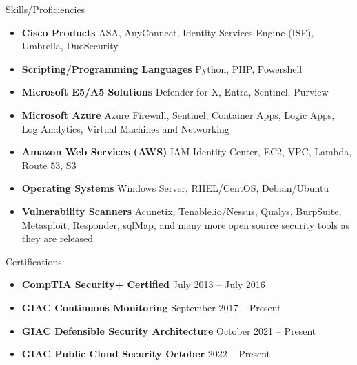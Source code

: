 \documentclass[]{mcdowellcv}
\begin{document}
\begin{cvsection}{Skills/Proficiencies}
    \begin{cvsubsection}{}{}{}
        \begin{itemize}
            \item \textbf{Cisco Products}  ASA, AnyConnect, Identity Services Engine (ISE), Umbrella, DuoSecurity
            \item \textbf{Scripting/Programming Languages}  Python, PHP, Powershell
            \item \textbf{Microsoft E5/A5 Solutions}  Defender for X, Entra, Sentinel, Purview
            \item \textbf{Microsoft Azure} Azure Firewall, Sentinel, Container Apps, Logic Apps, Log Analytics, Virtual Machines and Networking
            \item \textbf{Amazon Web Services (AWS)} IAM Identity Center, EC2, VPC, Lambda, Route 53, S3 
            \item \textbf{Operating Systems} Windows Server, RHEL/CentOS, Debian/Ubuntu
            \item \textbf{Vulnerability Scanners}  Acunetix, Tenable.io/Nessus, Qualys, BurpSuite, Metasploit, Responder, sqlMap, and many more open source security tools as they are released
        \end{itemize}
    \end{cvsubsection}
\end{cvsection}

\begin{cvsection}{Certifications}
	\begin{cvsubsection}{}{}{}
		\begin{itemize}
			\setlength\itemsep{3pt}
			\item \textbf{CompTIA Security+ Certified} \hfill July 2013 – July 2016
			\item \textbf{GIAC Continuous Monitoring} \hfill  September 2017 – Present
            \item \textbf{GIAC Defensible Security Architecture} \hfill  October 2021 – Present
            \item \textbf{GIAC Public Cloud Security October} \hfill  2022 – Present
		\end{itemize}
	\end{cvsubsection}
\end{cvsection}

\customfooter
\end{document}
